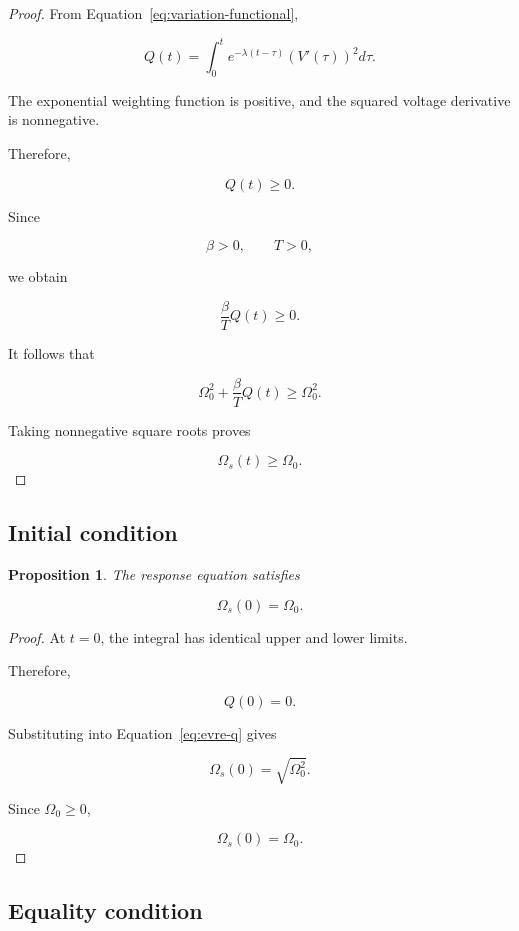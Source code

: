\documentclass[12pt]{article}
\newtheorem{proposition}[theorem]{Proposition}
\theoremstyle{definition}
\theoremstyle{remark}
\begin{document}
\begin{proof}

From Equation~\eqref{eq:variation-functional},

\[
Q(t)=
\int_0^t
e^{-\lambda(t-\tau)}
\left(V'(\tau)\right)^2d\tau.
\]

The exponential weighting function is positive,
and the squared voltage derivative is
nonnegative.

Therefore,

\[
Q(t)\geq0.
\]

Since

\[
\beta>0,\qquad T>0,
\]

we obtain

\[
\frac{\beta}{T}Q(t)\geq0.
\]

It follows that

\[
\Omega_0^2+\frac{\beta}{T}Q(t)
\geq\Omega_0^2.
\]

Taking nonnegative square roots proves

\[
\Omega_s(t)\geq\Omega_0.
\]

\end{proof}

\subsection{Initial condition}

\begin{proposition}

The response equation satisfies

\begin{equation}
\Omega_s(0)=\Omega_0.
\end{equation}

\end{proposition}

\begin{proof}

At \(t=0\), the integral has identical
upper and lower limits.

Therefore,

\[
Q(0)=0.
\]

Substituting into Equation~\eqref{eq:evre-q}
gives

\[
\Omega_s(0)=\sqrt{\Omega_0^2}.
\]

Since \(\Omega_0\geq0\),

\[
\Omega_s(0)=\Omega_0.
\]

\end{proof}

\subsection{Equality condition}
\end{document}
